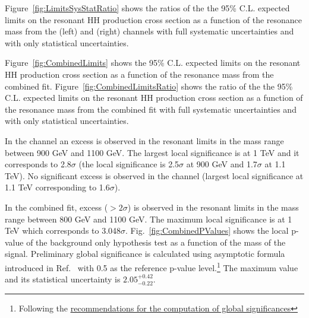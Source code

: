Figure~\ref{fig:LimitsSysStatRatio} shows the ratios of the the 95\% C.L. expected limits on the resonant HH production cross section as a function of the resonance mass from the \hadhad (left) and \lephad (right) channels with full systematic uncertainties and with only statistical uncertainties.

Figure~\ref{fig:CombinedLimits} shows the 95\% C.L. expected limits on the resonant HH production cross section as a function of the resonance mass from the combined fit. Figure~\ref{fig:CombinedLimitsRatio} shows the ratio of the the 95\% C.L. expected limits on the resonant HH production cross section as a function of the resonance mass from the combined fit with full systematic uncertainties and with only statistical uncertainties.

In the \hadhad channel an excess is observed in the resonant limits in the mass range between 900 GeV and 1100 GeV. The largest local significance is at 1 TeV and it corresponds to 2.8$\sigma$ (the local significance is 2.5$\sigma$ at 900 GeV and 1.7$\sigma$ at 1.1 TeV). No significant excess is observed in the \lephad channel (largest local significance at 1.1 TeV corresponding to 1.6$\sigma$).

In the combined fit, excess ($>2\sigma$) is observed in the resonant limits in the mass range between 800 GeV and 1100 GeV. The maximum local significance is at 1 TeV which corresponds to 3.048$\sigma$. Fig.~\ref{fig:CombinedPValues} shows the local p-value of the background only hypothesis test as a function of the mass of the signal. Preliminary global significance is calculated using asymptotic formula introduced in Ref.~\cite{LEE2010} with 0.5 as the reference p-value level.\footnote{Following the \href{https://twiki.cern.ch/twiki/bin/view/AtlasProtected/GlobalSignificanceComputations}{\underline{recommendations for the computation of global significances}}} The maximum value and its statistical uncertainty is $2.05_{-0.22}^{+0.42}$.  

